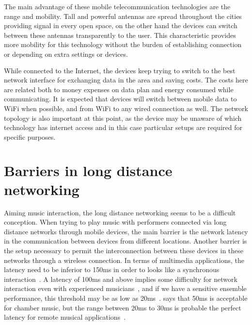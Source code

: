 The main advantage of these mobile telecommunication technologies are the range and mobility.
Tall and powerful antennas are spread throughout the cities providing signal in every open space, on the other hand the devices can switch between these antennas transparently to the user.
This characteristic provides more mobility for this technology without the burden of establishing connection or depending on extra settings or devices.

While connected to the Internet, the devices keep trying to switch to the best network interface for exchanging data in the area and saving costs.
The costs here are related both to money expenses on data plan and energy consumed while communicating.
It is expected that devices will switch between mobile data to WiFi when possible, and from WiFi to any wired connection as well.
The network topology is also important at this point, as the device may be unaware of which technology has internet access and in this case particular setups are required for specific purposes.


















\section{Barriers in long distance networking}

Aiming music interaction, the long distance networking seems to be a difficult conception.
When trying to play music with performers connected via long distance networks through mobile devices, the main barrier is the network latency in the communication between devices from different locations.
Another barrier is the setup necessary to permit the interconnection between these devices in these networks through a wireless connection. 
In terms of multimedia applications, the latency need to be inferior to 150ms in order to looks like a synchronous interaction~\citep{Coulouris2011distributed}.
A latency of 100ms and above implies some difficulty for network interaction even with experienced musicians~\citep{Bartlette2006networkeffect}, and if we have a sensitive ensemble performance, this threshold may be as low as 20ms~\citep{Chafe2004network}.
\cite{Lago2004thequest} says that 50ms is acceptable for chamber music, but the range between 20ms to 30ms is probable the perfect latency for remote musical applications~\citep{Lago2004thequest}. 

